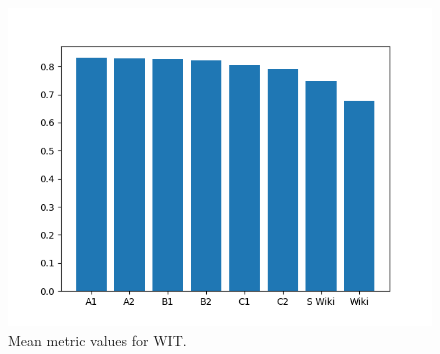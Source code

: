 \begin{figure}[ht]
    \centering
    \includegraphics[width=\columnwidth]{figs/assets/plot-WIT.png}
    \caption{Mean metric values for WIT.}
    \label{fig:wit-mean}
\end{figure}